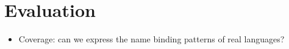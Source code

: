 \section{Evaluation}\label{evaluation}

\begin{itemize}
\itemsep1pt\parskip0pt
\item
  Coverage: can we express the name binding patterns of real languages?
\end{itemize}
